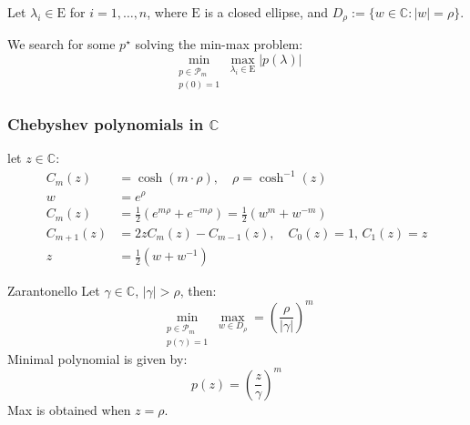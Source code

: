
Let $\lambda_i \in \mathrm{E}$ for $i = 1, \ldots, n$, where $\mathrm{E}$ is a closed ellipse, and $D_\rho := \{w \in \mathbb{C} : |w| = \rho\}$.

We search for some $p^\star$ solving the min-max problem:
\[
    \min_{\substack{p \in \mathcal{P}_m \\ p(0) = 1}} \max_{\lambda_i \in \mathrm{E}} |p(\lambda)|
\]

\subsubsection{Chebyshev polynomials in $\mathbb{C}$}
let $z \in \mathbb{C}$:
\begin{align*}
    C_m(z) &= \cosh(m \cdot \rho), \quad \rho = \cosh^{-1}(z) \\
    w & = e^{\rho}\\
    C_m(z) & = \frac{1}{2}(e^{m\rho} + e^{-m\rho}) = \frac{1}{2}(w^m + w^{-m}) \\
    C_{m+1}(z) & = 2zC_m(z) - C_{m-1}(z), \quad C_0(z) = 1, \, C_1(z) = z \\
    z & = \frac{1}{2}(w + w^{-1})
\end{align*}

\begin{lemma}{Zarantonello}{}
    Let $\gamma \in \mathbb{C}$, $|\gamma| > \rho$, then:
    \[
        \min_{\substack{p \in \mathcal{P}_m \\ p(\gamma) = 1}} \max_{w \in D_\rho} = \left(\frac{\rho}{|\gamma|}\right)^m
    \]
    Minimal polynomial is given by:
    \[
        p(z) = \left(\frac{z}{\gamma}\right)^m
    \]
    Max is obtained when $z = \rho$.
\end{lemma}

